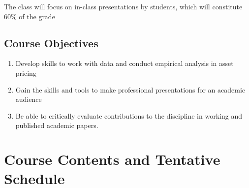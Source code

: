 \documentclass[letterpaper,12pt]{article}
\begin{document}
The class will focus on in-class presentations by students, which will constitute 60\% of the grade

\subsection*{Course Objectives}
\begin{enumerate}
   \item Develop skills to work with data and conduct empirical analysis in asset pricing
   \item Gain the skills and tools to make professional presentations for an academic audience
   \item Be able to critically evaluate contributions to the
      discipline in working and published academic papers.  
\end{enumerate}


\section*{\vspace*{-10mm}\;}
\begin{refsection}
\nocite{cochrane:05}
\nocite{campbell-lo-mackinlay:97}
\nocite{thaler:05}
\nocite{goyal:12}
%
\begingroup
{}
\printbibliography[heading=subbibliography,  title={Textbooks}]
\endgroup
\end{refsection}
%

\section*{Course Contents and Tentative Schedule}

\bigskip
\end{document}
